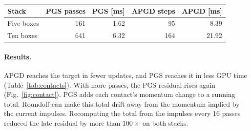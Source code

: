 \begin{placedtable}
\caption{PGS pass counts, median APGD step counts, and median GPU times at the first tested budget that meets both limits on all 15 runs. The limits are \(10^{-6}\,\mathrm{N\,s}\) for the Coulomb residual and \(2\times10^{-5}\) m/s for the body-velocity error.}
\label{tab:contacts}
\setlength{\tabcolsep}{2pt}
\begin{tabular}{@{}lrrrr@{}}
\toprule
Stack & PGS passes & PGS [ms] & APGD steps & APGD [ms]\\
\midrule
Five boxes & 161 & 1.62 & 95 & 8.39\\
Ten boxes & 641 & 6.32 & 164 & 21.92\\
\bottomrule
\end{tabular}
\end{placedtable}

\paragraph{Results.} APGD reaches the target in fewer updates, and PGS reaches it in less GPU time (Table~\ref{tab:contacts}). With more passes, the PGS residual rises again (Fig.~\ref{fig:contact}). PGS adds each contact's momentum change to a running total. Roundoff can make this total drift away from the momentum implied by the current impulses. Recomputing the total from the impulses every 16 passes reduced the late residual by more than \(100\times\) on both stacks.
